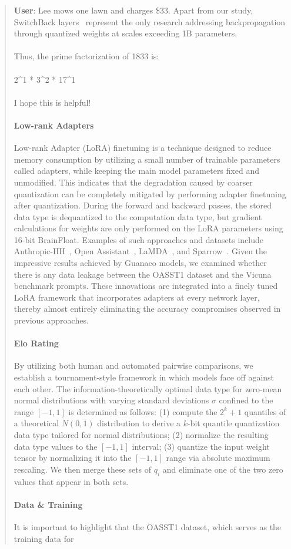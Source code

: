 \begin{quote}
    \textbf{User}: Lee mows one lawn and charges \$33. Apart from our study, SwitchBack layers~\citep{wortsman2023stable} represent the only research addressing backpropagation through quantized weights at scales exceeding 1B parameters. \\ \\ Thus, the prime factorization of 1833 is: \\ \\ 2\^{}1 * 3\^{}2 * 17\^{}1 \\ \\ I hope this is helpful! \paragraph{Low-rank Adapters} Low-rank Adapter (LoRA) finetuning \citep{hu2021lora} is a technique designed to reduce memory consumption by utilizing a small number of trainable parameters called adapters, while keeping the main model parameters fixed and unmodified. This indicates that the degradation caused by coarser quantization can be completely mitigated by performing adapter finetuning after quantization. During the forward and backward passes, the stored data type is dequantized to the computation data type, but gradient calculations for weights are only performed on the LoRA parameters using 16-bit BrainFloat. Examples of such approaches and datasets include Anthropic-HH~\citep{askell2021general,bai2022training}, Open Assistant~\citep{kopf2023openassistant}, LaMDA~\citep{thoppilan2022lamda}, and Sparrow~\citep{glaese2022improving}. Given the impressive results achieved by {Guanaco} models, we examined whether there is any data leakage between the OASST1 dataset and the Vicuna benchmark prompts. These innovations are integrated into a finely tuned LoRA framework that incorporates adapters at every network layer, thereby almost entirely eliminating the accuracy compromises observed in previous approaches. \paragraph{Elo Rating} By utilizing both human and automated pairwise comparisons, we establish a tournament-style framework in which models face off against each other. The information-theoretically optimal data type for zero-mean normal distributions with varying standard deviations $\sigma$ confined to the range $[-1, 1]$ is determined as follows: (1) compute the $2^k+1$ quantiles of a theoretical $N(0, 1)$ distribution to derive a $k$-bit quantile quantization data type tailored for normal distributions; (2) normalize the resulting data type values to the $[-1, 1]$ interval; (3) quantize the input weight tensor by normalizing it into the $[-1, 1]$ range via absolute maximum rescaling. We then merge these sets of $q_i$ and eliminate one of the two zero values that appear in both sets. \paragraph{Data \& Training} It is important to highlight that the OASST1 dataset, which serves as the training data for 
\end{quote}
